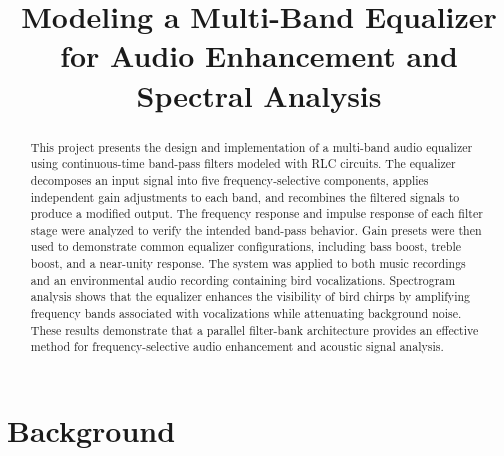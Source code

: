 \documentclass[conference]{IEEEtran}
\begin{document}
\title{Modeling a Multi-Band Equalizer for Audio Enhancement and Spectral Analysis\\
}

\author{
\and
{}
\and
{}
}

\maketitle

\begin{abstract}
This project presents the design and implementation of a multi-band audio equalizer using continuous-time band-pass filters modeled with RLC circuits.
 The equalizer decomposes an input signal into five frequency-selective components, applies independent gain adjustments to each band, and recombines the filtered signals to produce a modified output.
  The frequency response and impulse response of each filter stage were analyzed to verify the intended band-pass behavior.
   Gain presets were then used to demonstrate common equalizer configurations, including bass boost, treble boost, and a near-unity response.
    The system was applied to both music recordings and an environmental audio recording containing bird vocalizations.
     Spectrogram analysis shows that the equalizer enhances the visibility of bird chirps by amplifying frequency bands associated with vocalizations while attenuating background noise.
      These results demonstrate that a parallel filter-bank architecture provides an effective method for frequency-selective audio enhancement and acoustic signal analysis.
\end{abstract}


\section{Background}
\end{document}
